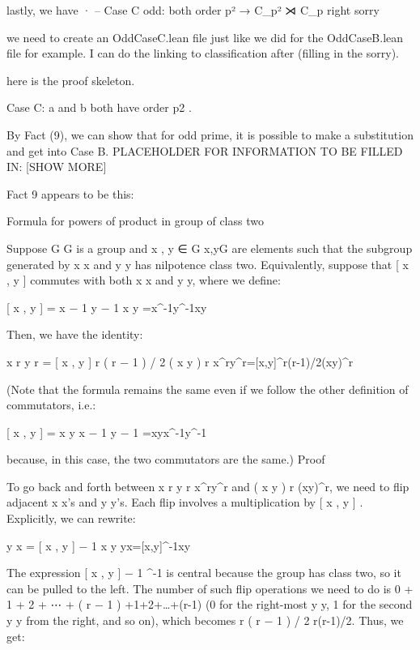 lastly, we have · -- Case C odd: both order p² → C_{p²} ⋊ C_p right sorry

we need to create an OddCaseC.lean file just like we did for the OddCaseB.lean file for example.
I can do the linking to classification after (filling in the sorry).

here is the proof skeleton.

Case C: a and b both have order p2 .

By Fact (9), we can show that for odd prime, it is possible to make a substitution and get into Case B. PLACEHOLDER FOR INFORMATION TO BE FILLED IN: [SHOW MORE]

Fact 9 appears to be this:

Formula for powers of product in group of class two

Suppose G {\displaystyle G} is a group and x , y ∈ G {\displaystyle x,y\in G} are elements such that the subgroup generated by x {\displaystyle x} and y {\displaystyle y} has nilpotence class two. Equivalently, suppose that [ x , y ] {\displaystyle [x,y]} commutes with both x {\displaystyle x} and y {\displaystyle y}, where we define:

[ x , y ] = x − 1 y − 1 x y {\displaystyle [x,y]=x^{-1}y^{-1}xy}

Then, we have the identity:

x r y r = [ x , y ] r ( r − 1 ) / 2 ( x y ) r {\displaystyle x^{r}y^{r}=[x,y]^{r(r-1)/2}(xy)^{r}}

(Note that the formula remains the same even if we follow the other definition of commutators, i.e.:

[ x , y ] = x y x − 1 y − 1 {\displaystyle [x,y]=xyx^{-1}y^{-1}}

because, in this case, the two commutators are the same.) Proof

To go back and forth between x r y r {\displaystyle x^{r}y^{r}} and ( x y ) r {\displaystyle (xy)^{r}}, we need to flip adjacent x {\displaystyle x}'s and y {\displaystyle y}'s. Each flip involves a multiplication by [ x , y ] {\displaystyle [x,y]}. Explicitly, we can rewrite:

y x = [ x , y ] − 1 x y {\displaystyle yx=[x,y]^{-1}xy}

The expression [ x , y ] − 1 {\displaystyle [x,y]^{-1}} is central because the group has class two, so it can be pulled to the left. The number of such flip operations we need to do is 0 + 1 + 2 + ⋯ + ( r − 1 ) {+1+2+\dots +(r-1)} (0 for the right-most y {\displaystyle y}, 1 for the second y {\displaystyle y} from the right, and so on), which becomes r ( r − 1 ) / 2 {\displaystyle r(r-1)/2}. Thus, we get:

